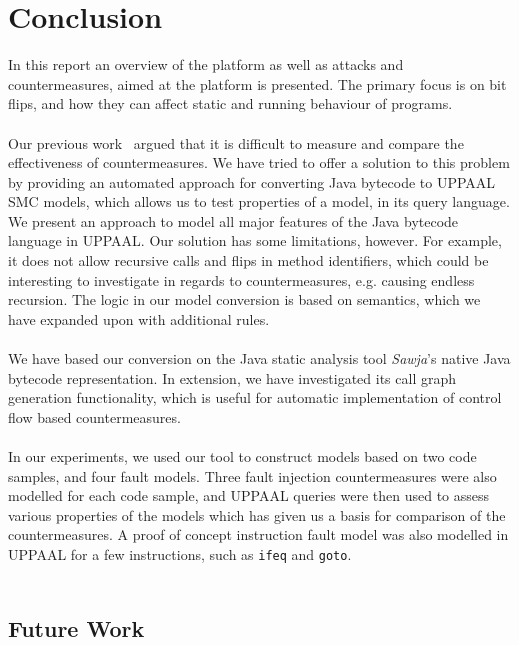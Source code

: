 \chapter{Conclusion}
In this report an overview of the \jc platform as well as attacks and countermeasures, aimed at the platform is presented. The primary focus is on bit flips, and how they can affect static and running behaviour of programs.\\\\
Our previous work~\cite{javasec} argued that it is difficult to measure and compare the effectiveness of countermeasures. We have tried to offer a solution to this problem by providing an automated approach for converting Java bytecode to UPPAAL SMC models, which allows us to test properties of a model, in its query language. We present an approach to model all major features of the Java bytecode language in UPPAAL. Our solution has some limitations, however. For example, it does not allow recursive calls and flips in method identifiers, which could be interesting to investigate in regards to countermeasures, e.g. causing endless recursion. The logic in our model conversion is based on \jcl semantics, which we have expanded upon with additional rules.\\\\
We have based our conversion on the Java static analysis tool \textit{Sawja}'s native Java bytecode representation. In extension, we have investigated its call graph generation functionality, which is useful for automatic implementation of control flow based countermeasures.\\\\
In our experiments, we used our tool to construct models based on two code samples, and four fault models. Three fault injection countermeasures were also modelled for each code sample, and UPPAAL queries were then used to assess various properties of the models which has given us a basis for comparison of the countermeasures. A proof of concept instruction fault model was also modelled in UPPAAL for a few instructions, such as \texttt{ifeq} and \texttt{goto}.\\\\
\section{Future Work}


